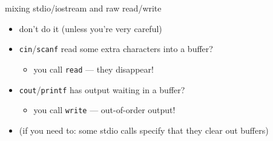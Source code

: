 

\begin{frame}{mixing stdio/iostream and raw read/write}
\begin{itemize}
\item don't do it (unless you're very careful)
\vspace{.5cm}
\item \texttt{cin}/\texttt{scanf} read some extra characters into a buffer?
    \begin{itemize}
    \item you call \texttt{read} --- they disappear!
    \end{itemize}
\item \texttt{cout}/\texttt{printf} has output waiting in a buffer?
    \begin{itemize}
    \item you call \texttt{write} --- out-of-order output!
    \end{itemize}
\vspace{.5cm}
\item (if you need to: some stdio calls specify that they clear out buffers)
\end{itemize}
\end{frame}
